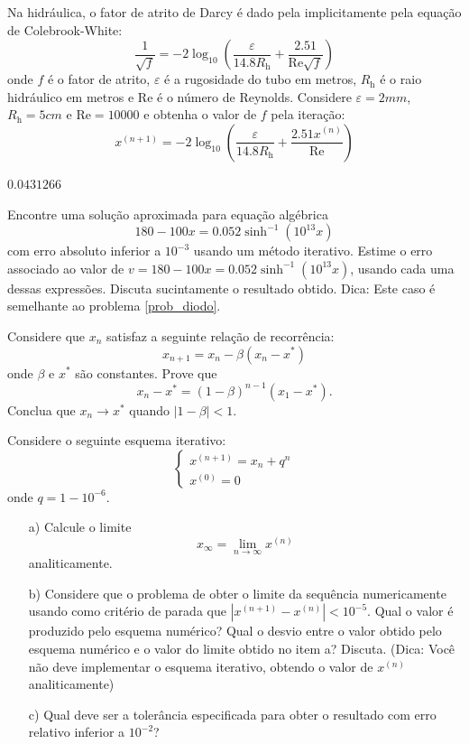 \begin{Exercise}[title=Fluidos] Na hidráulica, o fator de atrito de Darcy é dado pela implicitamente pela equação de Colebrook-White:
$$\frac{1}{\sqrt{f}}= -2 \log_{10} \left( \frac{\varepsilon}{14.8 R_\mathrm{h}} + \frac{2.51}{\mathrm{Re}\sqrt{f}} \right)$$
onde $f$ é o fator de atrito, $\varepsilon$ é a rugosidade do tubo em metros, $R_\mathrm{h}$ é o raio hidráulico em metros e $\mathrm{Re}$ é o número de Reynolds. Considere $\varepsilon=2mm$, $R_\mathrm{h}=5cm$ e $\mathrm{Re}=10000$ e obtenha o valor de $f$ pela iteração:
$$x^{(n+1)}=-2 \log_{10} \left( \frac{\varepsilon}{14.8 R_\mathrm{h}} + \frac{2.51x^{(n)}}{\mathrm{Re}} \right)$$
\end{Exercise}
\begin{Answer}
  \begin{tiny}
$0.0431266$
  \end{tiny}
\end{Answer}

\begin{Exercise} Encontre uma solução aproximada para equação algébrica
$$180-100x=0.052\sinh^{-1}(10^{13}x)$$
com erro absoluto inferior a $10^{-3}$ usando um método iterativo.
Estime o erro associado ao valor de $v=180-100x=0.052\sinh^{-1}(10^{13}x)$, usando cada uma dessas expressões. Discuta sucintamente o resultado obtido. Dica: Este caso é semelhante ao problema \ref{prob_diodo}.
\end{Exercise}

\begin{Exercise}Considere que $x_n$ satisfaz a seguinte relação de recorrência:
$$x_{n+1}=x_n - \beta \left(x_n-x^*\right)$$
onde $\beta$ e $x^*$ são constantes.
Prove que $$x_n-x^*=(1-\beta)^{n-1}(x_1-x^*).$$
Conclua que $x_n\to x^*$ quando $|1-\beta|<1$.
\end{Exercise}

\begin{Exercise}[title=Convergência lenta] Considere o seguinte esquema iterativo:
$$
\left\{\begin{array}{l}
x^{(n+1)}=x_n+q^n\\
x^{(0)}=0
\end{array}
\right.$$
onde $q=1-10^{-6}$.
\begin{itemize}
\item[a)] Calcule o limite $$x_\infty=\lim_{n\to\infty}x^{(n)}$$ analiticamente.
\item[b)] Considere que o problema de obter o limite da sequência numericamente usando como critério de parada que $|x^{(n+1)}-x^{(n)}|<10^{-5}$. Qual o valor é produzido pelo esquema numérico? Qual o desvio entre o valor obtido pelo esquema numérico e o valor do limite obtido no item a?  Discuta. (Dica: Você não deve implementar o esquema iterativo, obtendo o valor de $x^{(n)}$ analiticamente)
\item[c)] Qual deve ser a tolerância especificada para obter o resultado com erro relativo inferior a $10^{-2}$?
\end{itemize}
\end{Exercise}

